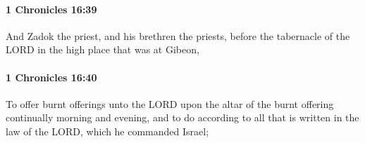 		\paragraph{1 Chronicles 16:39} %
			\label{1CHRONICLES-16-39}

			And Zadok the priest, and his brethren the priests, before the tabernacle of the LORD in the high place that was at Gibeon,


		\paragraph{1 Chronicles 16:40} %
			\label{1CHRONICLES-16-40}

			To offer burnt offerings unto the LORD upon the altar of the burnt offering continually morning and evening, and to do according to all that is written in the law of the LORD, which he commanded Israel;


